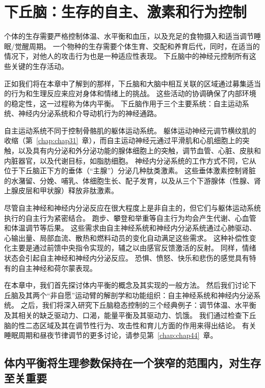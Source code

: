 \chapter{下丘脑：生存的自主、激素和行为控制} \label{chap:chap41}

个体的生存需要严格控制体温、水平衡和血压，以及充足的食物摄入和适当调节睡眠/觉醒周期。
一个物种的生存需要个体生育、交配和养育后代，同时，在适当的情况下，对他人的攻击行为也是一种适应性表现。
下丘脑中的神经元控制所有这些关键的生存活动。


正如我们将在本章中了解到的那样，下丘脑和大脑中相互关联的区域通过募集适当的行为和生理反应来应对身体和情绪上的挑战。
这些活动的协调确保了内部环境的稳定性，这一过程称为体内平衡。
下丘脑作用于三个主要系统：自主运动系统、神经内分泌系统和介导动机行为的神经通路。


自主运动系统不同于控制骨骼肌的躯体运动系统。 躯体运动神经元调节横纹肌的收缩（第~\ref{chap:chap31}~章），而自主运动神经元通过平滑肌和心肌细胞上的突触，以及具有内分泌和外分泌功能的腺体细胞上的突触，调节血管、心脏、皮肤和内脏器官，以及代谢目标，如脂肪细胞。
神经内分泌系统的工作方式不同，它从位于下丘脑正下方的垂体（“主腺”）分泌几种肽类激素。
这些垂体激素控制肾脏的水潴留、分娩、哺乳、体细胞生长、配子发育，以及从三个下游腺体（性腺、肾上腺皮层和甲状腺）释放非肽激素。


尽管自主神经和神经内分泌反应在很大程度上是非自主的，但它们与躯体运动系统执行的自主行为紧密结合。
跑步、攀登和举重等自主行为均会产生代谢、心血管和体温调节等后果。
这些需求由自主神经系统和神经内分泌系统通过心肺驱动、心输出量、局部血流、散热和燃料动员的变化自动满足这些需求。
这种补偿性变化主要是通过前馈中央指令实现的，辅之以由感官反馈激活的反射。
同样，情绪状态会引起自主神经和神经内分泌反应。
恐惧、愤怒、快乐和悲伤的感觉具有特有的自主神经和荷尔蒙表现。


在本章中，我们首先探讨体内平衡的概念及其实现的一般方法。
然后我们讨论下丘脑及其两个“非自愿”运动臂的解剖学和功能组织：自主神经系统和神经内分泌系统。
之后，我们将深入研究下丘脑稳态控制的三个经典例子：调节体温、水平衡及其相关的缺乏驱动力、口渴，能量平衡及其驱动力、饥饿。
我们通过检查下丘脑的性二态区域及其在调节性行为、攻击性和育儿方面的作用来得出结论。
有关睡眠周期和昼夜节律调节的更多讨论，请参见第~\ref{chap:chap44}~章。



\section{体内平衡将生理参数保持在一个狭窄的范围内，对生存至关重要}

